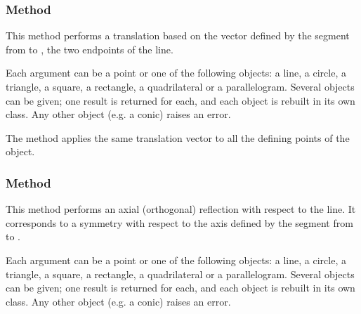 \subsubsection{Method }
\label{ssub:example_translation}

This method performs a translation based on the vector defined by the segment from  to , the two endpoints of the line.

\medskip

Each argument can be a point or one of the following objects:
a line, a circle, a triangle, a square, a rectangle, a quadrilateral or
a parallelogram. Several objects can be given; one result is returned
for each, and each object is rebuilt in its own class. Any other object
(e.g. a conic) raises an error.


The method applies the same translation vector to all the defining points of the object.

\vspace{1em}

\begin{tkzexample}[latex=.5\textwidth]
\begin{center}
\end{center}
\end{tkzexample}

\subsubsection{Method }
\label{ssub:reflection_of_object}

This method performs an axial (orthogonal) reflection with respect to the line. It corresponds to a symmetry with respect to the axis defined by the segment from  to .

\medskip

Each argument can be a point or one of the following objects:
a line, a circle, a triangle, a square, a rectangle, a quadrilateral or
a parallelogram. Several objects can be given; one result is returned
for each, and each object is rebuilt in its own class. Any other object
(e.g. a conic) raises an error.


